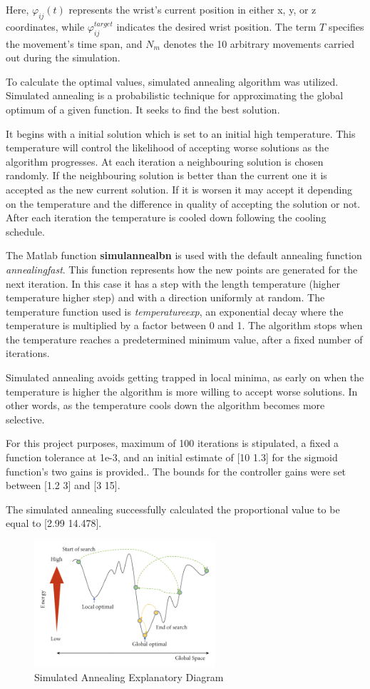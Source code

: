 Here, $\varphi_{ij}(t)$ represents the wrist's current position in either x, y, or z coordinates, while $\varphi_{ij}^{target}$ indicates the desired wrist position. The term $T$ specifies the movement's time span, and $N_m$ denotes the 10 arbitrary movements carried out during the simulation.

To calculate the optimal values, simulated annealing algorithm \cite{SimulatedAnnealing} was utilized. Simulated annealing is a probabilistic technique for approximating the global optimum of a given function. It seeks to find the best solution. 

It begins with a initial solution which is set to an initial high temperature. This temperature will control the likelihood of accepting worse solutions as the algorithm progresses. At each iteration a neighbouring solution is chosen randomly. If the neighbouring solution is better than the current one it is accepted as the new current solution. If it is worsen it may accept it depending on the temperature and the difference in quality of accepting the solution or not. After each iteration the temperature is cooled down following the cooling schedule. 


The Matlab function \textbf{simulannealbn} is used with the default annealing function \textit{annealingfast}. This function represents how the new points are generated for the next iteration. In this case it has a step with the length temperature (higher temperature higher step) and with a direction uniformly at random. The temperature function used is \textit{temperatureexp}, an exponential decay where the temperature is multiplied by a factor between 0 and 1. The algorithm stops when the temperature reaches a predetermined minimum value, after a fixed number of iterations. 

Simulated annealing avoids getting trapped in local minima, as early on when the temperature is higher the algorithm is more willing to accept worse solutions. In other words, as the temperature cools down the algorithm becomes more selective. 

For this project purposes, maximum of 100 iterations is stipulated, a fixed a function tolerance at 1e-3, and an initial estimate of [10 1.3] for the sigmoid function's two gains  is provided.. The bounds for the controller gains were set between [1.2 3] and [3 15].

The simulated annealing successfully calculated the proportional value to be equal to [2.99 14.478].

\begin{figure}[h!]
    \centering
    \includegraphics[width=0.6\textwidth]{Pictures/Controller/simulated_annealing.jpg}
    \caption{Simulated Annealing Explanatory Diagram \cite{SANN}}
    \label{fig:simulatedannealing}
\end{figure}
